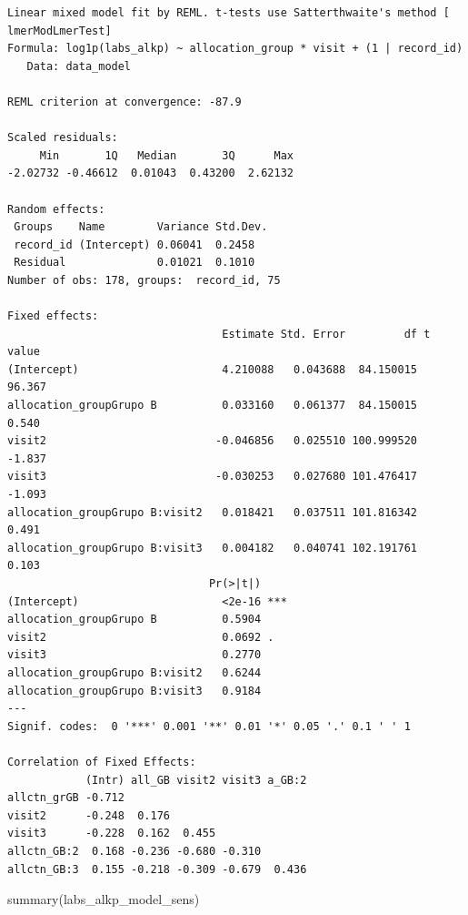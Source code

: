 \documentclass[
  letterpaper,
  DIV=11,
  numbers=noendperiod]{scrartcl}
\newenvironment{Shaded}{\begin{snugshade}}{\end{snugshade}}
\newcommand{\FunctionTok}[1]{\textcolor[rgb]{0.28,0.35,0.67}{#1}}
\newcommand{\NormalTok}[1]{\textcolor[rgb]{0.00,0.23,0.31}{#1}}
\begin{document}
\begin{verbatim}
Linear mixed model fit by REML. t-tests use Satterthwaite's method [
lmerModLmerTest]
Formula: log1p(labs_alkp) ~ allocation_group * visit + (1 | record_id)
   Data: data_model

REML criterion at convergence: -87.9

Scaled residuals: 
     Min       1Q   Median       3Q      Max 
-2.02732 -0.46612  0.01043  0.43200  2.62132 

Random effects:
 Groups    Name        Variance Std.Dev.
 record_id (Intercept) 0.06041  0.2458  
 Residual              0.01021  0.1010  
Number of obs: 178, groups:  record_id, 75

Fixed effects:
                                 Estimate Std. Error         df t value
(Intercept)                      4.210088   0.043688  84.150015  96.367
allocation_groupGrupo B          0.033160   0.061377  84.150015   0.540
visit2                          -0.046856   0.025510 100.999520  -1.837
visit3                          -0.030253   0.027680 101.476417  -1.093
allocation_groupGrupo B:visit2   0.018421   0.037511 101.816342   0.491
allocation_groupGrupo B:visit3   0.004182   0.040741 102.191761   0.103
                               Pr(>|t|)    
(Intercept)                      <2e-16 ***
allocation_groupGrupo B          0.5904    
visit2                           0.0692 .  
visit3                           0.2770    
allocation_groupGrupo B:visit2   0.6244    
allocation_groupGrupo B:visit3   0.9184    
---
Signif. codes:  0 '***' 0.001 '**' 0.01 '*' 0.05 '.' 0.1 ' ' 1

Correlation of Fixed Effects:
            (Intr) all_GB visit2 visit3 a_GB:2
allctn_grGB -0.712                            
visit2      -0.248  0.176                     
visit3      -0.228  0.162  0.455              
allctn_GB:2  0.168 -0.236 -0.680 -0.310       
allctn_GB:3  0.155 -0.218 -0.309 -0.679  0.436
\end{verbatim}

\begin{Shaded}
\begin{Highlighting}[]
\FunctionTok{summary}\NormalTok{(labs\_alkp\_model\_sens)}
\end{Highlighting}
\end{Shaded}
\end{document}

